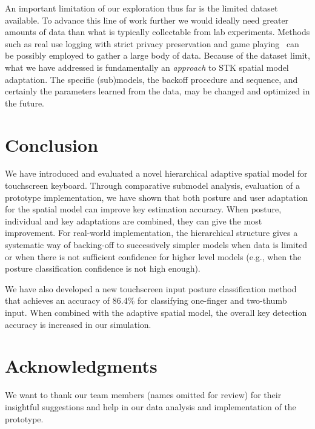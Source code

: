 \documentclass{sigchi}
\begin{document}
An important limitation of our exploration thus far is the limited dataset available. To advance this line of work further we would ideally need greater amounts of data than what is typically collectable from lab experiments. Methods such as real use logging with strict privacy preservation and game playing~\cite{Rudchenko:2011} can be possibly employed to gather a large body of data. Because of the dataset limit, what we have addressed is fundamentally an \textit{approach} to STK spatial model adaptation. The specific (sub)models, the backoff procedure and sequence, and certainly the parameters learned from the data, may be changed and optimized in the future. 

\section{Conclusion}
We have introduced and evaluated a novel hierarchical adaptive spatial model for
touchscreen keyboard. Through comparative submodel analysis,  evaluation of a prototype implementation, we have shown that both posture and user adaptation for the spatial model can improve key estimation accuracy. When posture, individual and key adaptations are combined, they can
give the most improvement. For real-world
implementation, the
hierarchical structure gives a systematic way of backing-off to successively simpler models  when data is limited
or when there is not sufficient confidence for higher level models (e.g., when the posture classification confidence is not 
high enough).

We have also developed a new touchscreen input posture classification method
that achieves an accuracy of 86.4\% for classifying one-finger and two-thumb input. When
combined with the adaptive spatial model, the overall key detection accuracy is increased
in our simulation.
\section{Acknowledgments}
We want to thank our team members (names omitted for review) for their insightful
suggestions and help in  our data analysis and implementation of the prototype.
\balance
\small


\end{document}
